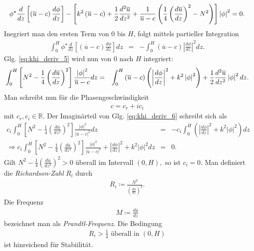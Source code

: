 \documentclass{book}
\newcommand\newoverline[1]{%
\overline{#1}}
\begin{document}
%
\begin{eqnarray}
\phi^\star\frac{d}{dz}\left[\left(\newoverline{u} - c\right)\frac{d\phi}{dz}\right] - \left[k^2\left(\newoverline{u} - c\right) + \frac{1}{2}\frac{d^2\newoverline{u}}{dz^2} + \frac{1}{\newoverline{u} - c}\left(\frac{1}{4}\left(\frac{d\newoverline{u}}{dz}\right)^2 - N^2\right)\right]\left|\phi\right|^2 = 0.\label{eq:khi_deriv_5}
\end{eqnarray}
%
Inegriert man den ersten Term von $0$ bis $H$, folgt mittels partieller Integration
%
\begin{eqnarray}
\int_0^H\phi^\star\frac{d}{dz}\left[\left(\newoverline{u} - c\right)\frac{d\phi}{dz}\right]dz & = & -\int_0^H\left(\newoverline{u} - c\right)\left|\frac{d\phi}{dz}\right|^2dz.
\end{eqnarray}
%
Glg. \eqref{eq:khi_deriv_5} wird nun von $0$ nach $H$ integriert:
%
\begin{eqnarray}
\int_0^H\left[N^2 - \frac{1}{4}\left(\frac{d\newoverline{u}}{dz}\right)^2\right]\frac{\left|\phi\right|^2}{\newoverline{u} - c}dz & = & \int_0^H\left(\newoverline{u} - c\right)\left(\left|\frac{d\phi}{dz}\right|^2 + k^2\left|\phi\right|^2\right) + \frac{1}{2}\frac{d^2\newoverline{u}}{dz^2}\left|\phi\right|^2dz.\label{eq:khi_deriv_6}
\end{eqnarray}
%
Man schreibt nun für die Phasengeschwindigkeit
%
\begin{eqnarray}
c = c_r + ic_i
\end{eqnarray}
%
mit $c_r, c_i\in\mathbb{R}$. Der Imaginärteil von Glg. \eqref{eq:khi_deriv_6} schreibt sich als
%
\begin{eqnarray}
c_i\int_0^H\left[N^2 - \frac{1}{4}\left(\frac{d\newoverline{u}}{dz^2}\right)^2\right]\frac{\left|\phi\right|^2}{\left|\newoverline{u} - c\right|^2}dz & = & -c_i\int_0^H\left(\left|\frac{d\phi}{dz}\right|^2 + k^2\left|\phi\right|^2\right)dz\nonumber\\
\Rightarrow c_i\int_0^H\left[N^2 - \frac{1}{4}\left(\frac{d\newoverline{u}}{dz^2}\right)^2\right]\frac{\left|\phi\right|^2}{\left|\newoverline{u} - c\right|^2} + \left|\frac{d\phi}{dz}\right|^2 + k^2\left|\phi\right|^2dz & = & 0.
\end{eqnarray}
%
Gilt $N^2 - \frac{1}{4}\left(\frac{d\newoverline{u}}{dz^2}\right)^2 > 0$ überall im Intervall $\left(0, H\right), $ so ist $c_i = 0$. Man definiert die \textit{Richardson-Zahl} $R_i$ durch
%
\begin{eqnarray}
R_i \coloneqq \frac{N^2}{\left(\frac{d\newoverline{u}}{dz}\right)^2}.
\end{eqnarray}
%
Die Frequenz
%
\begin{eqnarray}
M \coloneqq \frac{d\newoverline{u}}{dz}
\end{eqnarray}
%
bezeichnet man als \textit{Prandtl-Frequenz}. Die Bedingung
%
\begin{eqnarray}
R_i > \frac{1}{4}\text{ überall in }\left(0, H\right)
\end{eqnarray}
%
ist hinreichend für Stabiilität.
\end{document}

